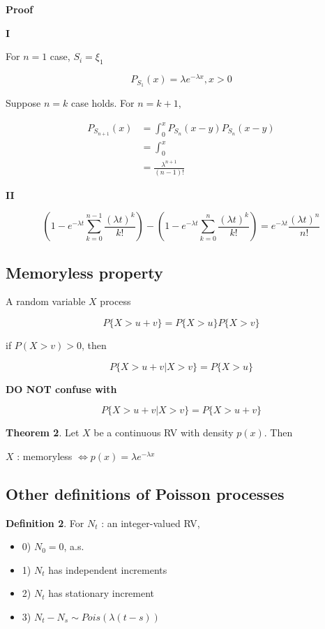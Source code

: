 \documentclass[12pt]{article}
\theoremstyle{nonumberbreak}
\begin{document}
\textbf{Proof} 

\textbf{I}

For $n=1$ case, $S_i = \xi_1$

$$
P_{S_1} (x) = \lambda e^{-\lambda x}, x>0
$$

Suppose $n=k$ case holds. For $n=k+1$, 

$$
\begin{aligned}
P_{S_{n+1}}(x) &= \int_0^x P_{S_n} ( x-y)  P_{S_n} ( x-y) \\[8pt]
&= \int_0^x \frac{}{} \\[8pt]
&= \frac{\lambda^{n+1}}{(n-1)!} 
\end{aligned}
$$




\textbf{II}

$$
(1 - e^{-\lambda t} \sum_{k=0}^{n-1} \frac{(\lambda t)^k}{k!}) - (1 - e^{-\lambda t} \sum_{k=0}^n \frac{(\lambda t)^k}{k!}) = e^{-\lambda t} \frac{(\lambda t)^n}{n!}
$$



\subsection{Memoryless property}


A random variable $X$ process 

$$
P \{ X > u + v \} = P \{ X > u  \} P \{ X > v \}
$$

if $P (X > v) > 0$, then

$$
P \{ X > u + v  | X > v\} = P\{ X > u\}
$$


\textbf{DO NOT confuse with}

$$
P \{ X > u + v  | X > v\} = P\{ X > u + v\}
$$


\begin{theorem}
\textbf{Theorem 2}. Let $X$ be a continuous RV with density $p(x)$. Then

\begin{center}
$X$ : memoryless $\Leftrightarrow p(x) = \lambda e^{-\lambda x}$
\end{center}

\end{theorem}



\subsection{Other definitions of Poisson processes}


\begin{theorem}
\textbf{Definition 2}. For $N_t$ : an integer-valued RV,

\begin{itemize}
	\item 0) $N_0 = 0$, a.s.
	\item 1) $N_t$ has independent increments 
	\item 2) $N_t$ has stationary increment 
	\item 3) $N_t - N_s \sim Pois (\lambda (t-s))$
\end{itemize}
\end{theorem}
\end{document}
